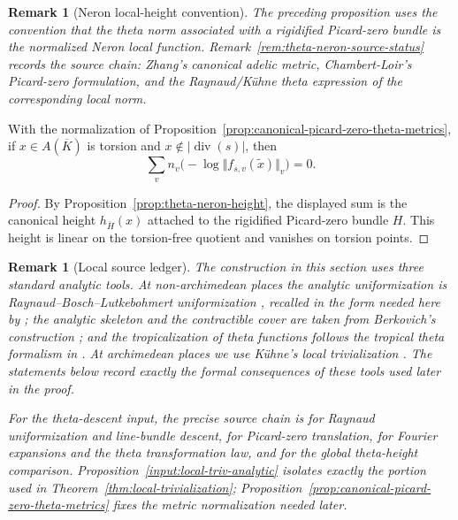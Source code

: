 \documentclass[10pt,a4paper]{amsart}
\theoremstyle{plain}
\newtheorem{remark}[theorem]{Remark}
\theoremstyle{plain}
\numberwithin{equation}{section}
\begin{document}
\begin{remark}[Neron local-height convention]\label{rem:neron-local-height-convention}
	The preceding proposition uses the convention that the theta norm associated
	with a rigidified Picard-zero bundle is the normalized Neron local function.
	Remark~\ref{rem:theta-neron-source-status} records the source chain: Zhang's
	canonical adelic metric, Chambert-Loir's Picard-zero formulation, and the
	Raynaud/K\"uhne theta expression of the corresponding local norm.
\end{remark}
\begin{cor}
	\label{cor:torsion-picard-global-cancellation}
	With the normalization of Proposition~\ref{prop:canonical-picard-zero-theta-metrics}, if
	\(x\in A(\overline K)\) is torsion and
	\(x\notin|\operatorname{div}(s)|\), then
	\[
	\sum_v n_v\bigl(-\log\Vert f_{s,v}(\widetilde x)\Vert_v\bigr)=0.
	\]
\end{cor}
\begin{proof}
	By Proposition~\ref{prop:theta-neron-height}, the displayed sum is the
	canonical height \(h_{\overline H}(x)\) attached to the rigidified
	Picard-zero bundle \(H\).  This height is linear on the torsion-free quotient
	and vanishes on torsion points.
\end{proof}

\begin{remark}[Local source ledger]\label{rem:local-triv-source-ledger}
	The construction in this section uses three standard analytic tools.  At non-archimedean
	places the analytic uniformization is Raynaud--Bosch--Lutkebohmert
	uniformization \cite{TJFA}, recalled in the form needed here by \cite{FRSS};
	the analytic skeleton and the contractible cover are taken from Berkovich's
	construction \cite{Ber}; and the tropicalization of theta functions follows the
	tropical theta formalism in \cite{FRSS}.  At archimedean places we use K\"uhne's
	local trivialization
	\cite[Lemma 11]{Ku1}.  The statements below record exactly the formal
	consequences of these tools used later in the proof.
	
	For the theta-descent input, the precise source chain is
	\cite[Sections~3.2--3.3 and Theorem~3.6]{Ku1} for Raynaud uniformization and
	line-bundle descent, \cite[Propositions~3.8--3.9]{Ku1} for Picard-zero
	translation, \cite[Section~3.6 and Proposition~3.13]{Ku1} for Fourier
	expansions and the theta transformation law, and \cite[Theorem~4.7]{Ku1} for
	the global theta-height comparison.  Proposition~\ref{input:local-triv-analytic}
	isolates exactly the portion used in Theorem~\ref{thm:local-trivialization};
	Proposition~\ref{prop:canonical-picard-zero-theta-metrics} fixes the metric
	normalization needed later.
\end{remark}
\end{document}
